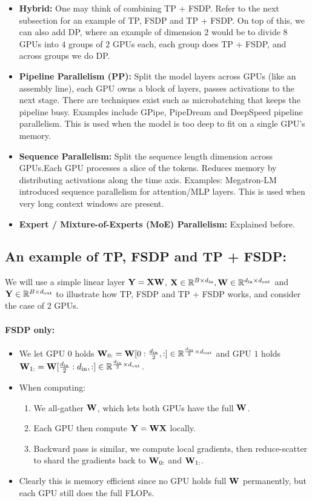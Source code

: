 \documentclass[11pt]{article}  %
\begin{document}
\begin{itemize}
  \item \textbf{Hybrid:} One may think of combining TP + FSDP. 
  Refer to the next subsection for an example of TP, FSDP and TP + FSDP.
  On top of this, we can also add DP, where an example of dimension $2$ would be to divide $8$ GPUs into $4$ groups of $2$ GPUs each, each group does TP + FSDP, and across groups we do DP.

  \item \textbf{Pipeline Parallelism (PP):} Split the model layers across GPUs (like an assembly line), each GPU owns a block of layers, passes activations to the next stage.
  There are techniques exist such as microbatching that keeps the pipeline busy.
  Examples include GPipe, PipeDream and DeepSpeed pipeline parallelism.
  This is used when the model is too deep to fit on a single GPU's memory.

  \item  \textbf{Sequence Parallelism:} Split the sequence length dimension across GPUs.Each GPU processes a slice of the tokens. Reduces memory by distributing activations along the time axis.
  Examples: Megatron-LM introduced sequence parallelism for attention/MLP layers.
  This is used when very long context windows are present.

  \item \textbf{Expert / Mixture-of-Experts (MoE) Parallelism:} Explained before.
\end{itemize}


\subsection{An example of TP, FSDP and TP + FSDP:}
We will use a simple linear layer $\mathbf{Y} = \mathbf{X}\mathbf{W}$, $\mathbf{X} \in \mathbb{R}^{B \times d_{\text{in}}}, \mathbf{W} \in \mathbb{R}^{d_{\text{in}} \times d_{\text{out}}}$ and $\mathbf{Y} \in \mathbb{R}^{B \times d_{\text{out}}}$ to illustrate how TP, FSDP and TP + FSDP works, and consider the case of $2$ GPUs.

\paragraph{FSDP only:}
\begin{itemize}
  \item We let GPU $0$ holds $\mathbf{W}_{0:} = \mathbf{W}[0:\frac{d_{\text{in}}}{2}, :] \in \mathbb{R}^{\frac{d_{\text{in}}}{2} \times d_{\text{out}}}$ and GPU $1$ holds $\mathbf{W}_{1:} = \mathbf{W}[\frac{d_{\text{in}}}{2}:d_{\text{in}}, :] \in \mathbb{R}^{\frac{d_{\text{in}}}{2} \times d_{\text{out}}}$.
  \item When computing:
  \begin{enumerate}
    \item We all-gather $\mathbf{W}$, which lets both GPUs have the full $\mathbf{W}$.
    \item Each GPU then compute $\mathbf{Y} = \mathbf{W}\mathbf{X}$ locally.
    \item Backward pass is similar, we compute local gradients, then reduce-scatter to shard the gradients back to $\mathbf{W}_{0:}$ and $\mathbf{W}_{1:}$.
  \end{enumerate}

  \item Clearly this is memory efficient since no GPU holds full $\mathbf{W}$ permanently, but each GPU still does the full FLOPs.
\end{itemize}
\end{document}
